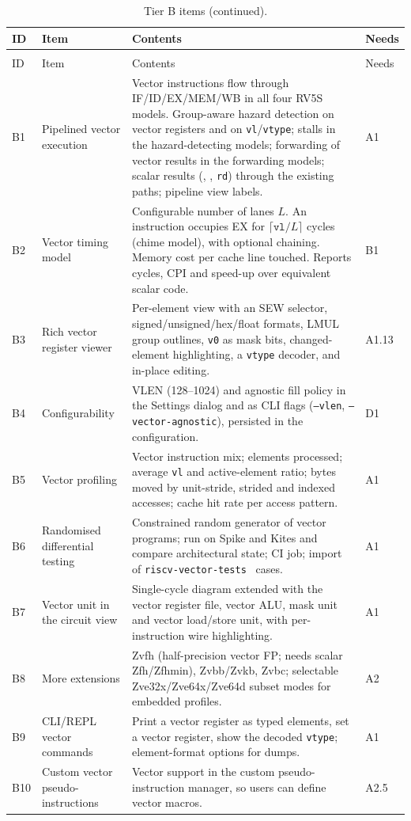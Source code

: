 \documentclass[11pt]{article}
\begin{document}
\small
\begin{longtable}{@{}L{0.7cm}L{3.4cm}L{9.6cm}L{1.0cm}@{}}
\caption{Tier B items, in priority order.}\label{tab:tierB}\\
\toprule
ID & Item & Contents & Needs \\
\midrule
\endfirsthead
\caption[]{Tier B items (continued).}\\
\toprule
ID & Item & Contents & Needs \\
\midrule
\endhead
B1 & Pipelined vector execution & Vector instructions flow through IF/ID/EX/MEM/WB in all four RV5S models. Group-aware hazard detection on vector registers and on \texttt{vl}/\texttt{vtype}; stalls in the hazard-detecting models; forwarding of vector results in the forwarding models; scalar results (, ,  \texttt{rd}) through the existing paths; pipeline view labels. & A1 \\
B2 & Vector timing model & Configurable number of lanes $L$. An instruction occupies EX for $\lceil\texttt{vl}/L\rceil$ cycles (chime model), with optional chaining. Memory cost per cache line touched. Reports cycles, CPI and speed-up over equivalent scalar code. & B1 \\
B3 & Rich vector register viewer & Per-element view with an SEW selector, signed/unsigned/hex/float formats, LMUL group outlines, \texttt{v0} as mask bits, changed-element highlighting, a \texttt{vtype} decoder, and in-place editing. & A1.13 \\
B4 & Configurability & VLEN (128--1024) and agnostic fill policy in the Settings dialog and as CLI flags (\texttt{--vlen}, \texttt{--vector-agnostic}), persisted in the configuration. & D1 \\
B5 & Vector profiling & Vector instruction mix; elements processed; average \texttt{vl} and active-element ratio; bytes moved by unit-stride, strided and indexed accesses; cache hit rate per access pattern. & A1 \\
B6 & Randomised differential testing & Constrained random generator of vector programs; run on Spike and Kites and compare architectural state; CI job; import of \texttt{riscv-vector-tests}~\cite{rvvtests} cases. & A1 \\
B7 & Vector unit in the circuit view & Single-cycle diagram extended with the vector register file, vector ALU, mask unit and vector load/store unit, with per-instruction wire highlighting. & A1 \\
B8 & More extensions & Zvfh (half-precision vector FP; needs scalar Zfh/Zfhmin), Zvbb/Zvkb, Zvbc; selectable Zve32x/Zve64x/Zve64d subset modes for embedded profiles. & A2 \\
B9 & CLI/REPL vector commands & Print a vector register as typed elements, set a vector register, show the decoded \texttt{vtype}; element-format options for dumps. & A1 \\
B10 & Custom vector pseudo-instructions & Vector support in the custom pseudo-instruction manager, so users can define vector macros. & A2.5 \\
\bottomrule
\end{longtable}
\normalsize
\end{document}
